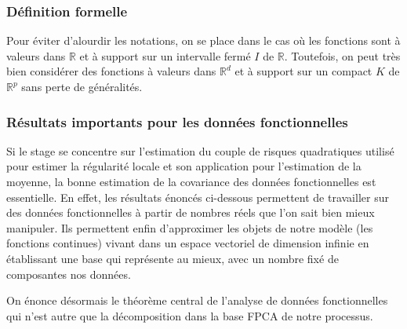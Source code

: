 \subsubsection{Définition formelle}

Pour éviter d'alourdir les notations, on se place dans le cas où les fonctions sont à valeurs dans $\mathds R$ et à support sur un intervalle fermé $I$ de $\mathds R$. Toutefois, on peut très bien considérer des fonctions à valeurs dans $\mathds R^d$ et à support sur un compact $K$ de $\mathds R^p$ sans perte de généralités.



\subsubsection{Résultats importants pour les données fonctionnelles}


Si le stage se concentre sur l'estimation du couple de risques quadratiques utilisé pour estimer la régularité locale et son application pour l'estimation de la moyenne, la  bonne estimation de la covariance des données fonctionnelles est essentielle. En effet, les résultats énoncés ci-dessous permettent de travailler sur des données fonctionnelles à partir de nombres réels que l'on sait bien mieux manipuler. Ils permettent enfin d'approximer les objets de notre modèle (les fonctions continues) vivant dans un espace vectoriel de dimension infinie en établissant une base qui représente au mieux, avec un nombre fixé de composantes nos données.

\bigskip

On énonce désormais le théorème central de l'analyse de données fonctionnelles qui n'est autre que la décomposition dans la base FPCA de notre processus.

